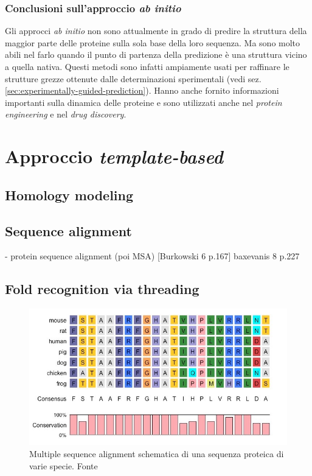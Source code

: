 {\subsubsection{Conclusioni sull'approccio \textit{ab initio}}
Gli approcci \textit{ab initio} non sono attualmente in grado di predire la struttura della maggior parte delle proteine sulla sola base della loro sequenza. Ma sono molto abili nel farlo quando il punto di partenza della predizione è una struttura vicino a quella nativa. Questi metodi sono infatti ampiamente usati per raffinare le strutture grezze ottenute dalle determinazioni sperimentali (vedi sez. \ref{sec:experimentally-guided-prediction}). Hanno anche fornito informazioni importanti sulla dinamica delle proteine e sono utilizzati anche nel \textit{protein engineering} e nel \textit{drug discovery}.

}
\section{Approccio \textit{template-based}}

\subsection{Homology modeling}

\subsection{Sequence alignment}
- protein sequence alignment (poi MSA)
[Burkowski 6 p.167]
baxevanis 8 p.227

\subsection{Fold recognition via threading}


\begin{figure}[!htb]
	\centering
	\includegraphics[scale=0.5]{images/msa.jpeg}
	\caption{Multiple sequence alignment schematica di una sequenza proteica di varie specie. Fonte\cite{msaBioNinja}}
	\label{fig:msa}
\end{figure}

